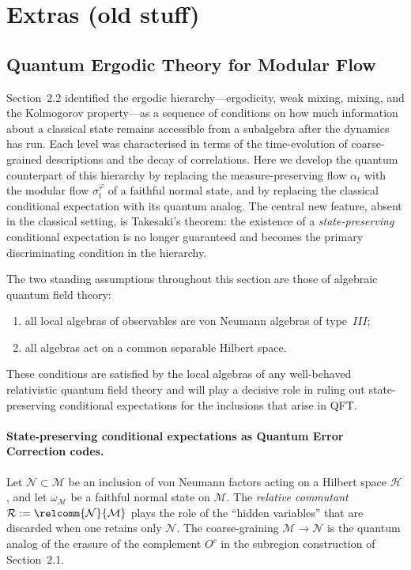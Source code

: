 \documentclass[a4paper,11pt]{article}
\theoremstyle{definition}
\begin{document}
 \section{Extras (old stuff)}


\subsection{Quantum Ergodic Theory for Modular Flow}
\label{subsec:quantum-ergodic}

Section~2.2 identified the ergodic hierarchy---ergodicity, weak mixing, mixing,
and the Kolmogorov property---as a sequence of conditions on how much information
about a classical state remains accessible from a subalgebra after the dynamics has
run. Each level was characterised in terms of the time-evolution of coarse-grained
descriptions and the decay of correlations. Here we develop the quantum counterpart
of this hierarchy by replacing the measure-preserving flow $\alpha_t$ with the modular
flow $\sigma_t^\varphi$ of a faithful normal state, and by replacing the classical conditional
expectation with its quantum analog. The central new feature, absent in the classical setting,
is Takesaki's theorem: the existence of a \emph{state-preserving} conditional expectation
is no longer guaranteed and becomes the primary discriminating condition in the hierarchy.

The two standing assumptions throughout this section are those of algebraic quantum
field theory:
\begin{enumerate}[label=(\arabic*)]
  \item all local algebras of observables are von Neumann algebras of type~$III$;
  \item all algebras act on a common separable Hilbert space.
\end{enumerate}
These conditions are satisfied by the local algebras of any well-behaved relativistic
quantum field theory and will play a decisive role in ruling out state-preserving
conditional expectations for the inclusions that arise in QFT.

\paragraph{State-preserving conditional expectations as Quantum Error Correction codes.}
Let $\mathcal{N}\subset\mathcal{M}$ be an inclusion of von Neumann factors acting on a
Hilbert space $\mathcal{H}$, and let $\omega_\mathcal{M}$ be a faithful normal state on
$\mathcal{M}$.  The \emph{relative commutant} $\mathcal{R}:= \relcomm{\mathcal{N}}{\mathcal{M}}$
plays the role of the ``hidden variables'' that are discarded when one retains only
$\mathcal{N}$.  The coarse-graining $\mathcal{M}\to\mathcal{N}$ is the quantum analog of
the erasure of the complement $O^c$ in the subregion construction of Section~2.1.
\end{document}
